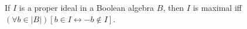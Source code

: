 If $I$ is a proper ideal in a Boolean algebra $B$, then $I$ is maximal iff $(\forall b \in |B|)[b \in I \leftrightarrow -b \notin I]$.
